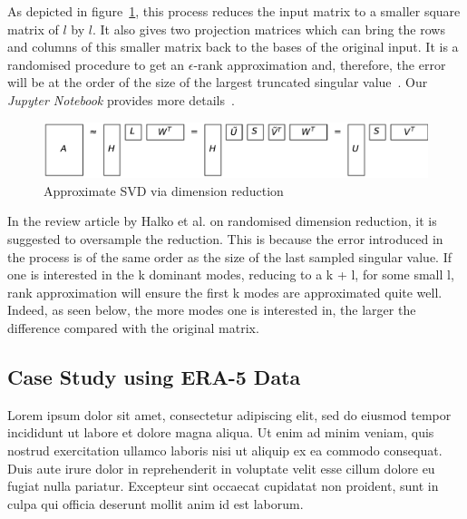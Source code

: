 \documentclass[ijgi,article,submit,moreauthors,pdftex,10pt,a4paper]{Definitions/mdpi}
\begin{document}
As depicted in figure~\ref{fig:reduceSizeRandomisedSquare}, this process reduces the input matrix to a smaller square matrix of $l$ by $l$. It also gives two projection matrices which can bring the rows and columns of this smaller matrix back to the bases of the original input. It is a randomised procedure to get an $\epsilon$-rank approximation and, therefore, the error will be at the order of the size of the largest truncated singular value~\cite{Martinsson2016, Halko2011}. Our \textit{Jupyter Notebook} provides more details~\cite{Bogaardt2018}.

\begin{figure}[H]
\centering
\includegraphics[width=120mm]{Results/reduceSizeRandomisedSquare.pdf}
\caption[Approximate randomised SVD]{Approximate SVD via dimension reduction}
\label{fig:reduceSizeRandomisedSquare}
\end{figure}

In the review article by Halko et al. on randomised dimension reduction, it is suggested to oversample the reduction. This is because the error introduced in the process is of the same order as the size of the last sampled singular value. If one is interested in the k dominant modes, reducing to a k + l, for some small l, rank approximation will ensure the first k modes are approximated quite well. Indeed, as seen below, the more modes one is interested in, the larger the difference compared with the original matrix.%

\subsection{Case Study using ERA-5 Data}
\label{sec:Materials and Methods/Case Study using ERA-5 Data}

Lorem ipsum dolor sit amet, consectetur adipiscing elit, sed do eiusmod tempor incididunt ut labore et dolore magna aliqua. Ut enim ad minim veniam, quis nostrud exercitation ullamco laboris nisi ut aliquip ex ea commodo consequat. Duis aute irure dolor in reprehenderit in voluptate velit esse cillum dolore eu fugiat nulla pariatur. Excepteur sint occaecat cupidatat non proident, sunt in culpa qui officia deserunt mollit anim id est laborum.
\end{document}
